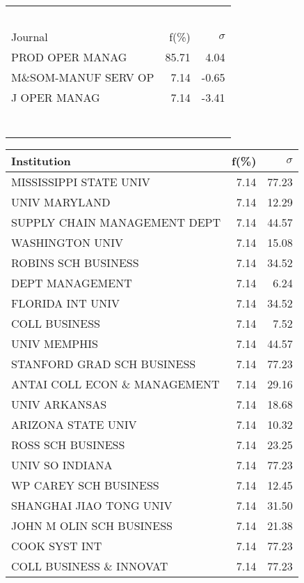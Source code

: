 \documentclass[a4paper,11pt]{report}
\begin{document}
\begin{landscape}
\begin{table}[!ht]
{\begin{tabular}{|l r  r|}
 &  & \\
 &  & \\
 &  & \\
 &  & \\
 &  & \\
\hline
\hline
Journal & f(\%) & $\sigma$\\
\hline
PROD OPER MANAG & 85.71 & 4.04\\
M\&SOM-MANUF SERV OP & 7.14 & -0.65\\
J OPER MANAG & 7.14 & -3.41\\
 &  & \\
 &  & \\
 &  & \\
 &  & \\
 &  & \\
 &  & \\
 &  & \\
\hline
\end{tabular}
}
{\scriptsize\begin{tabular}{|l r r|}
\hline
Institution & f(\%) & $\sigma$\\
\hline
MISSISSIPPI STATE UNIV & 7.14 & 77.23\\
UNIV MARYLAND & 7.14 & 12.29\\
SUPPLY CHAIN MANAGEMENT DEPT & 7.14 & 44.57\\
WASHINGTON UNIV & 7.14 & 15.08\\
ROBINS SCH BUSINESS & 7.14 & 34.52\\
DEPT MANAGEMENT & 7.14 & 6.24\\
FLORIDA INT UNIV & 7.14 & 34.52\\
COLL BUSINESS & 7.14 & 7.52\\
UNIV MEMPHIS & 7.14 & 44.57\\
STANFORD GRAD SCH BUSINESS & 7.14 & 77.23\\
ANTAI COLL ECON \& MANAGEMENT & 7.14 & 29.16\\
UNIV ARKANSAS & 7.14 & 18.68\\
ARIZONA STATE UNIV & 7.14 & 10.32\\
ROSS SCH BUSINESS & 7.14 & 23.25\\
UNIV SO INDIANA & 7.14 & 77.23\\
WP CAREY SCH BUSINESS & 7.14 & 12.45\\
SHANGHAI JIAO TONG UNIV & 7.14 & 31.50\\
JOHN M OLIN SCH BUSINESS & 7.14 & 21.38\\
COOK SYST INT & 7.14 & 77.23\\
COLL BUSINESS \& INNOVAT & 7.14 & 77.23\\

\end{tabular}}
\end{table}
\end{landscape}
\end{document}
